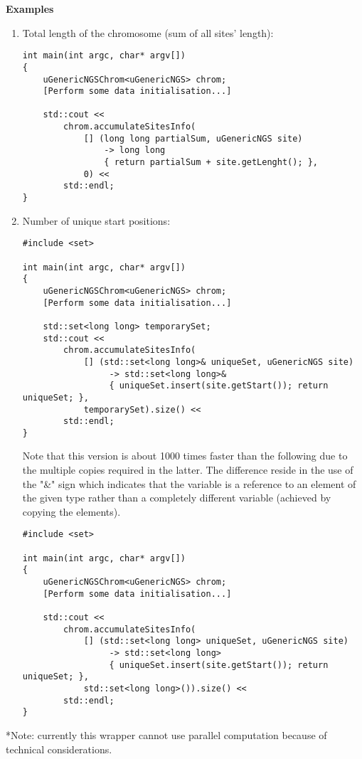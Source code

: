 \documentclass[letterpaper,10pt]{article}
\begin{document}
\bigskip
\noindent{}\textbf{Examples}
\begin{enumerate}
 \item Total length of the chromosome (sum of all sites' length):
\begin{verbatim}
int main(int argc, char* argv[])
{
    uGenericNGSChrom<uGenericNGS> chrom;
    [Perform some data initialisation...]

    std::cout << 
        chrom.accumulateSitesInfo(
            [] (long long partialSum, uGenericNGS site) 
                -> long long 
                { return partialSum + site.getLenght(); }, 
            0) << 
        std::endl;
}
\end{verbatim}

\item Number of unique start positions:
\begin{verbatim}
#include <set>

int main(int argc, char* argv[])
{
    uGenericNGSChrom<uGenericNGS> chrom;
    [Perform some data initialisation...]

    std::set<long long> temporarySet;
    std::cout << 
        chrom.accumulateSitesInfo(
            [] (std::set<long long>& uniqueSet, uGenericNGS site) 
                 -> std::set<long long>& 
                 { uniqueSet.insert(site.getStart()); return uniqueSet; }, 
            temporarySet).size() << 
        std::endl;
}
\end{verbatim}

Note that this version is about 1000 times faster than the following due to the multiple copies required in the latter. The difference reside in the use of the "\&" sign which indicates that the variable is a reference to an element of the given type rather than a  completely different variable (achieved by copying the elements).
\begin{verbatim}
#include <set>

int main(int argc, char* argv[])
{
    uGenericNGSChrom<uGenericNGS> chrom;
    [Perform some data initialisation...]

    std::cout << 
        chrom.accumulateSitesInfo(
            [] (std::set<long long> uniqueSet, uGenericNGS site) 
                 -> std::set<long long> 
                 { uniqueSet.insert(site.getStart()); return uniqueSet; }, 
            std::set<long long>()).size() << 
        std::endl;
}
\end{verbatim}
\end{enumerate}

\noindent{}*Note: currently this wrapper cannot use parallel computation because of technical considerations.
\end{document}
